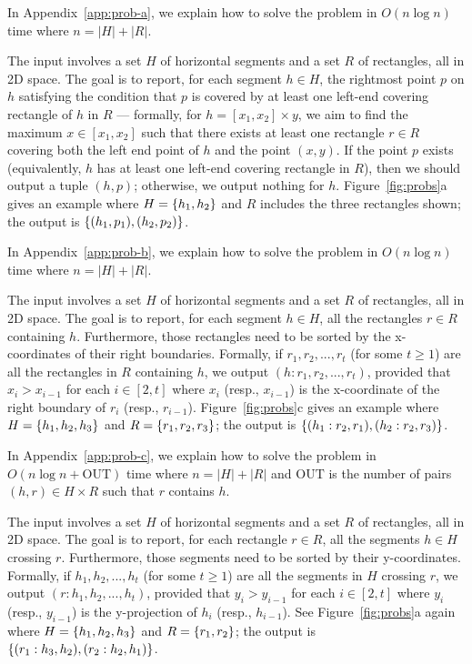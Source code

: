 \documentclass[sigconf]{acmart}
\def\vgap{\vspace{1mm}}
\def\extraspacing{\vspace{2mm} \noindent}
\def\out{\mathrm{OUT}}
\begin{document}
\vgap

In Appendix~\ref{app:prob-a}, we explain how to solve the problem in $O(n \log n)$ time where $n = |H| + |R|$.

\extraspacing {\bf Problem $\bm{\EuScript{B}}$.} The input involves a set $H$ of horizontal segments and a set $R$ of rectangles, all in 2D space. The goal is to report, for each segment $h \in H$, the rightmost point $p$ on $h$ satisfying the condition that $p$ is covered by at least one left-end covering rectangle of $h$ in $R$ --- formally, for $h = [x_1, x_2] \times y$, we aim to find the maximum $x \in [x_1, x_2]$ such that there exists at least one rectangle $r \in R$ covering both the left end point of $h$ and the point $(x, y)$. If the point $p$ exists (equivalently, $h$ has at least one left-end covering rectangle in $R$), then we should output a tuple $(h, p)$; otherwise, we output nothing for $h$. Figure~\ref{fig:probs}a gives an example where $H = \{h_1, h_2\}$ and $R$ includes the three rectangles shown; the output is $\{(h_1, p_1), (h_2, p_2)\}$.

\vgap

In Appendix~\ref{app:prob-b}, we explain how to solve the problem in $O(n \log n)$ time where $n = |H| + |R|$.

\extraspacing {\bf Problem $\bm{\EuScript{C}}$.} The input involves a set $H$ of horizontal segments and a set $R$ of rectangles, all in 2D space. The goal is to report, for each segment $h \in H$, all the rectangles $r \in R$ containing $h$. Furthermore, those rectangles need to be sorted by the x-coordinates of their right boundaries. Formally, if $r_1, r_2, ..., r_t$ (for some $t \ge 1$) are all the rectangles in $R$ containing $h$, we output $(h: r_1, r_2, ..., r_t)$, provided that $x_i > x_{i-1}$ for each $i \in [2, t]$ where $x_i$ (resp., $x_{i-1}$) is the x-coordinate of the right boundary of $r_i$ (resp., $r_{i-1}$). Figure~\ref{fig:probs}c gives an example where $H = \{h_1, h_2, h_3\}$ and $R = \{r_1, r_2, r_3\}$; the output is $\{(h_1: r_2, r_1), (h_2: r_2, r_3)\}$.

\vgap

In Appendix~\ref{app:prob-c}, we explain how to solve the problem in $O(n \log n + \out)$ time where $n = |H| + |R|$ and $\out$ is the number of pairs $(h, r) \in H \times R$ such that $r$ contains $h$.

\extraspacing {\bf Problem $\bm{\EuScript{D}}$.} The input involves a set $H$ of horizontal segments and a set $R$ of rectangles, all in 2D space. The goal is to report, for each rectangle $r \in R$, all the segments $h \in H$ crossing $r$. Furthermore, those segments need to be sorted by their y-coordinates. Formally, if $h_1, h_2, ..., h_t$ (for some $t \ge 1$) are all the segments in $H$ crossing $r$, we output $(r: h_1, h_2, ..., h_t)$, provided that $y_i > y_{i-1}$ for each $i \in [2, t]$ where $y_i$ (resp., $y_{i-1}$) is the y-projection of $h_i$ (resp., $h_{i-1}$). See Figure~\ref{fig:probs}a again where $H = \{h_1, h_2, h_3\}$ and $R = \{r_1, r_2\}$; the output is $\{(r_1: h_3, h_2), (r_2: h_2, h_1)\}$.
\end{document}
